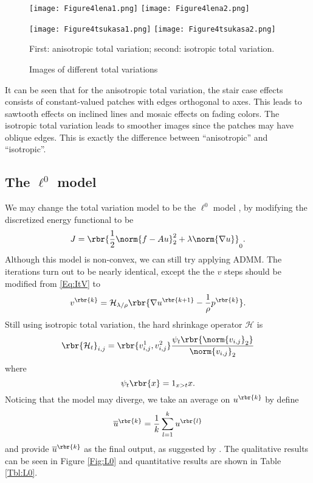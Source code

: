 \documentclass[english, nochinese]{pnote}
\begin{document}
\begin{figure}[htb]
{
\centering

\texttt{[image: Figure4lena1.png]}
\texttt{[image: Figure4lena2.png]}

\texttt{[image: Figure4tsukasa1.png]}
\texttt{[image: Figure4tsukasa2.png]}

\caption{Images of different total variations}
\label{Fig:Iso}
}
{
\footnotesize First: anisotropic total variation; second: isotropic total variation.
}
\end{figure}

It can be seen that for the anisotropic total variation, the stair case effects consists of constant-valued patches with edges orthogonal to axes. This leads to sawtooth effects on inclined lines and mosaic effects on fading colors. The isotropic total variation leads to smoother images since the patches may have oblique edges. This is exactly the difference between ``anisotropic'' and ``isotropic''.

\subsection{The $\ell^0$ model}

We may change the total variation model to be the $\ell^0$ model \parencite{xu_image_2011} \parencite{dong_efficient_2013}, by modifying the discretized energy functional to be
\begin{equation}
J = \rbr{ \frac{1}{2} \norm{ f - A u }_2^2 + \lambda \norm{ \nabla u } }_0.
\end{equation}
Although this model is non-convex, we can still try applying ADMM. The iterations turn out to be nearly identical, except the the $v$ steps should be modified from \eqref{Eq:ItV} to
\begin{equation}
v^{\rbr{k}} = \mathcal{H}_{ \lambda / \rho } \rbr{ \nabla u^{\rbr{ k + 1 }} - \frac{1}{\rho} p^{\rbr{k}} }.
\end{equation}
Still using isotropic total variation, the hard shrinkage operator $\mathcal{H}$ is
\begin{equation}
\rbr{ \mathcal{H}_t }_{ i, j } = \rbr{ v_{ i, j }^1, v_{ i, j }^2 } \frac{ \psi_t \rbr{\norm{v_{ i, j }}_2} }{\norm{v_{ i, j }}_2}
\end{equation}
where
\begin{equation}
\psi_t \rbr{x} = 1_{ x > t } x.
\end{equation}
Noticing that the model may diverge, we take an average on $u^{\rbr{k}}$ by define
\begin{equation}
\overline{u}^{\rbr{k}} = \frac{1}{k} \sum_{ l = 1 }^k u^{\rbr{l}}
\end{equation}
and provide $\overline{u}^{\rbr{k}}$ as the final output, as suggested by \parencite{dong_efficient_2013}. The qualitative results can be seen in Figure \ref{Fig:L0} and quantitative results are shown in Table \ref{Tbl:L0}.
\end{document}
